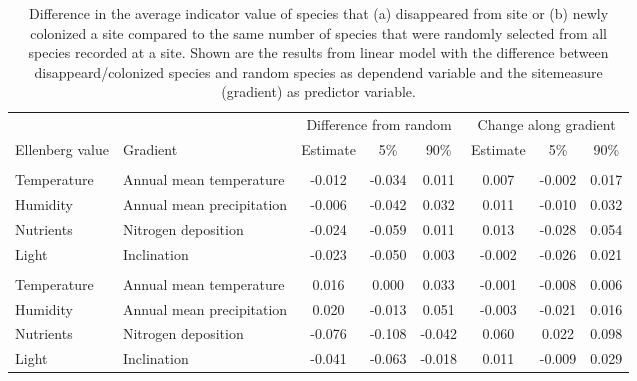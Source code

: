 \documentclass[fleqn,10pt,lineno]{wlpeerj} %
\theoremstyle{definition}
\theoremstyle{definition}
\theoremstyle{definition}
\theoremstyle{remark}
\begin{document}
\begin{table}

\caption{\label{tab:difffromrandomtab}Difference in the average indicator value of species that (a) disappeared from site or (b) newly colonized a site compared to the same number of species that were randomly selected from all species recorded at a site. Shown are the results from linear model with the difference between disappeard/colonized species and random species as dependend variable and the sitemeasure (gradient) as predictor variable.}
\centering
\begin{tabular}[t]{llcccccc}
\toprule
\multicolumn{2}{c}{ } & \multicolumn{3}{c}{Difference from random} & \multicolumn{3}{c}{Change along gradient} \\
\cmidrule(l{2pt}r{2pt}){3-5} \cmidrule(l{2pt}r{2pt}){6-8}
Ellenberg value & Gradient & Estimate & 5\% & 90\% & Estimate & 5\% & 90\%\\
\midrule
\addlinespace[0.3em]
\multicolumn{8}{l}{\textit{(a) Plants that disappeard from a site}}\\
\hspace{1em}Temperature & Annual mean temperature & -0.012 & -0.034 & 0.011 & 0.007 & -0.002 & 0.017\\
\hspace{1em}Humidity & Annual mean precipitation & -0.006 & -0.042 & 0.032 & 0.011 & -0.010 & 0.032\\
\hspace{1em}Nutrients & Nitrogen deposition & -0.024 & -0.059 & 0.011 & 0.013 & -0.028 & 0.054\\
\hspace{1em}Light & Inclination & -0.023 & -0.050 & 0.003 & -0.002 & -0.026 & 0.021\\
\addlinespace[0.3em]
\multicolumn{8}{l}{\textit{(b) Plants that newly colonized a site}}\\
\hspace{1em}Temperature & Annual mean temperature & 0.016 & 0.000 & 0.033 & -0.001 & -0.008 & 0.006\\
\hspace{1em}Humidity & Annual mean precipitation & 0.020 & -0.013 & 0.051 & -0.003 & -0.021 & 0.016\\
\hspace{1em}Nutrients & Nitrogen deposition & -0.076 & -0.108 & -0.042 & 0.060 & 0.022 & 0.098\\
\hspace{1em}Light & Inclination & -0.041 & -0.063 & -0.018 & 0.011 & -0.009 & 0.029\\
\bottomrule
\end{tabular}
\end{table}
\end{document}
